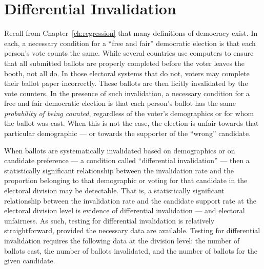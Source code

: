 \section{Differential Invalidation}\label{sriLanka-diffInv}
Recall from Chapter~\ref{ch:regression} that many definitions of democracy exist.\cite[e.g.]{dahl-shapiro-2015,lijphart-1999,putnam-2001} In each, a necessary condition for a ``free and fair'' democratic election is that each person's vote counts the same. While several countries use computers to ensure that all submitted ballots are properly completed before the voter leaves the booth, not all do. In those electoral systems that do not, voters may complete their ballot paper incorrectly. These ballots are then licitly invalidated by the vote counters. In the presence of such invalidation, a necessary condition for a free and fair democratic election is that each person's ballot has the same \emph{probability of being counted}, regardless of the voter's demographics or for whom the ballot was cast. When this is not the case, the election is unfair towards that particular demographic --- or towards the supporter of the ``wrong'' candidate.\cite{ekanem-forsberg-2018}

When ballots are systematically invalidated based on demographics or on candidate preference --- a condition called ``differential invalidation'' --- then a statistically significant relationship between the invalidation rate and the proportion belonging to that demographic or voting for that candidate in the electoral division may be detectable.\cite{forsberg-2014} That is, a statistically significant relationship between the invalidation rate and the candidate support rate at the electoral division level is evidence of differential invalidation --- and electoral unfairness. As such, testing for differential invalidation is relatively straightforward, provided the necessary data are available. Testing for differential invalidation requires the following data at the division level: the number of ballots cast, the number of ballots invalidated, and the number of ballots for the given candidate.\cite{ekanem-forsberg-2018, forsberg-2014}













